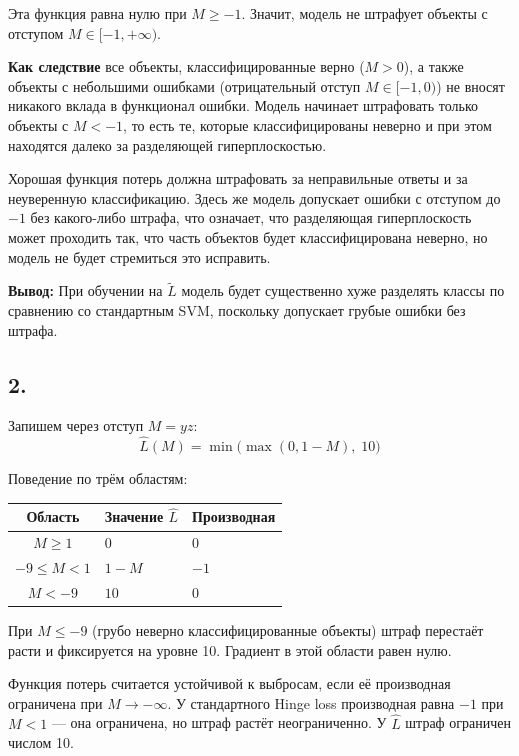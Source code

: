 \documentclass[12pt,a4paper]{article}
\begin{document}
Эта функция равна нулю при $M \geqslant -1$. Значит, модель не штрафует объекты с отступом $M \in [-1, +\infty)$.

\textbf{Как следствие} все объекты, классифицированные верно ($M > 0$), а также объекты с небольшими ошибками (отрицательный отступ $M \in [-1, 0)$) не вносят никакого вклада в функционал ошибки. Модель начинает штрафовать только объекты с $M < -1$, то есть те, которые классифицированы неверно и при этом находятся далеко за разделяющей гиперплоскостью.

Хорошая функция потерь должна штрафовать за неправильные ответы и за неуверенную классификацию. Здесь же модель допускает ошибки с отступом до $-1$ без какого-либо штрафа, что означает, что разделяющая гиперплоскость может проходить так, что часть объектов будет классифицирована неверно, но модель не будет стремиться это исправить.

\textbf{Вывод:} При обучении на $\tilde{L}$ модель будет существенно хуже разделять классы по сравнению со стандартным SVM, поскольку допускает грубые ошибки без штрафа.

\subsection*{2.}

Запишем через отступ $M = yz$:
\[
\hat{L}(M) = \min\bigl(\max(0, 1-M),\; 10\bigr)
\]

Поведение по трём областям:
\begin{center}
\begin{tabular}{cll}
\toprule
\textbf{Область} & \textbf{Значение $\hat{L}$} & \textbf{Производная} \\
\midrule
$M \geqslant 1$        & $0$       & $0$ \\
$-9 \leqslant M < 1$   & $1-M$     & $-1$ \\
$M < -9$               & $10$      & $0$ \\
\bottomrule
\end{tabular}
\end{center}

При $M \leqslant -9$ (грубо неверно классифицированные объекты) штраф перестаёт расти и фиксируется на уровне 10. Градиент в этой области равен нулю.

Функция потерь считается устойчивой к выбросам, если её производная ограничена при $M \to -\infty$. У стандартного Hinge loss производная равна $-1$ при $M < 1$ --- она ограничена, но штраф растёт неограниченно. У $\hat{L}$ штраф ограничен числом 10.
\end{document}
